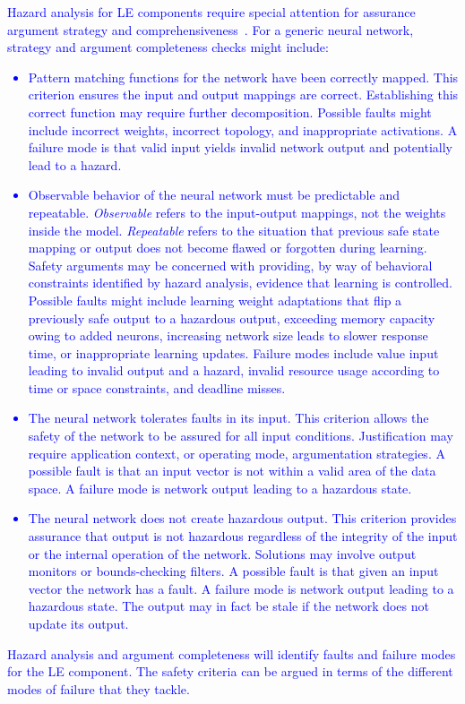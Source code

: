 \textcolor{blue}{
Hazard analysis for LE components require special attention for assurance argument strategy and comprehensiveness~\cite{SafetyANN}.  For a generic neural network, strategy and argument completeness checks might include:
\begin{itemize}
\item Pattern matching functions for the network have been correctly mapped.  This criterion ensures the input and output mappings are correct. Establishing this correct function may require further decomposition.  Possible faults might include incorrect weights, incorrect topology, and inappropriate activations.  A failure mode is that valid input yields invalid network output and potentially lead to a hazard.  
\item Observable behavior of the neural network must be predictable and repeatable.  {\em Observable\/} refers to the input-output mappings, not the weights inside the model.  {\em Repeatable\/} refers to the situation that previous safe state mapping or output does not become flawed or forgotten during learning.  Safety arguments may be concerned with providing, by way of behavioral constraints identified by hazard analysis, evidence that learning is controlled. Possible faults might include learning weight adaptations that flip a previously safe output to a hazardous output, exceeding memory capacity owing to added neurons, increasing network size leads to slower response time, or inappropriate learning updates.  Failure modes include value input leading to invalid output and a hazard, invalid resource usage according to time or space constraints, and deadline misses.  
\item The neural network tolerates faults in its input.  This criterion allows the safety of the network to be assured for all input conditions. Justification may require application context, or operating mode, argumentation strategies.  A possible fault is that an input vector is not within a valid area of the data space.   A failure mode is network output leading to a hazardous state. 
\item The neural network does not create hazardous output.  This criterion provides assurance that output is not hazardous regardless of the integrity of the input or the internal operation of the network.  Solutions may involve output monitors or bounds-checking filters.  A possible fault is that given an input vector the network has a fault.  A failure mode is network output leading to a hazardous state. The output may in fact be stale if the network does not update its output. 
\end{itemize}
Hazard analysis and argument completeness will identify faults and failure modes for the LE component.  The safety criteria can be argued in terms of the different modes of failure that they tackle.  
}


